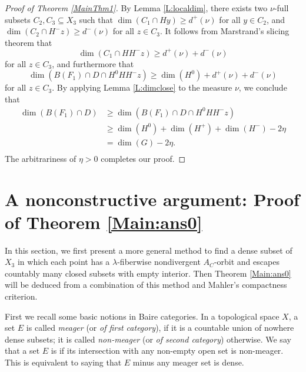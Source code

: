 \documentclass[reqno,12pt]{amsart}
\theoremstyle{definition}
\numberwithin{equation}{section}
\begin{document}
{\begin{proof}[Proof of Theorem \ref{MainThm1}]
By Lemma \ref{L:localdim}, there exists two $\nu$-full subsets $C_2,C_3\subseteq X_3$ such that \linebreak %
$\dim(C_1\cap Hy)\geq d^+(\nu)$ for all $y\in C_2$, and $\dim(C_2\cap H^-z)\geq d^-(\nu)$ for all $z\in C_3$. It follows from Marstrand's slicing theorem that $$
\dim(C_1\cap HH^-z)\geq d^+(\nu)+d^-(\nu)
$$
for all $z\in C_3$, and furthermore that $$
\dim(B(F_1)\cap D\cap H^0HH^-z)\geq \dim(H^0)+d^+(\nu)+d^-(\nu)
$$
for all $z\in C_3$. 
By applying Lemma \ref{L:dimclose} to the measure $\nu$, we conclude that 
\begin{equation*}
\begin{aligned}
    \dim(B(F_1)\cap D)&\geq \dim(B(F_1)\cap D\cap H^0HH^-z)\\
    &\geq \dim(H^0)+\dim(H^+)+\dim(H^-)-2\eta\\
    &=\dim(G)-2\eta.\\
    \end{aligned}
\end{equation*}
The arbitrariness of $\eta>0$ completes our proof.
\end{proof}









\section{A nonconstructive argument: Proof of Theorem \ref{Main:ans0}} \label{nonconstr}
In this section, we first present a more general method to find a dense subset of $X_3$ in which each point has a $\lambda$-fiberwise nondivergent $A_C$-orbit and escapes countably many closed subsets with empty interior. Then Theorem \ref{Main:ans0} will be deduced from a combination of this method and Mahler's compactness criterion.

{First we recall some basic notions in Baire categories. In a topological space $X$, a set $E$ is called \textit{meager} (or \textit{of first category}), if it is a countable union of nowhere dense subsets; it is called \textit{non-meager} (or \textit{of second category}) otherwise. We say that a set $E$ is  if its intersection with any non-empty open set is non-meager. This is equivalent to saying that $E$ minus any meager set is dense.}

}
\end{document}
